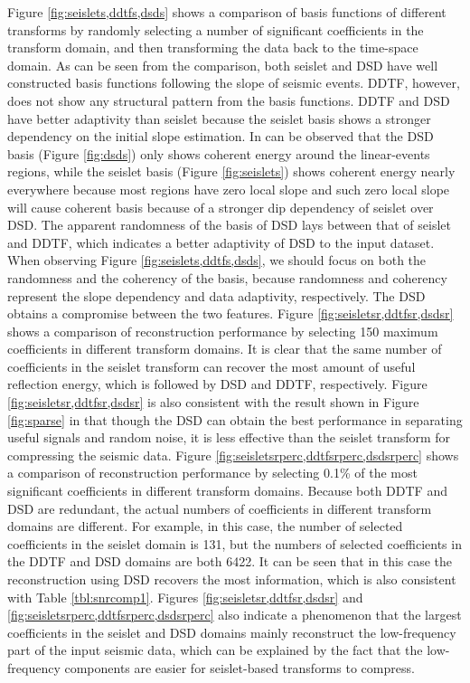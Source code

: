 Figure \ref{fig:seislets,ddtfs,dsds} shows a comparison of basis functions of different transforms by randomly selecting a number of significant coefficients in the transform domain, and then transforming the data back to the time-space domain. As can be seen from the comparison, both seislet and DSD have well constructed basis functions following the slope of seismic events. DDTF, however, does not show any structural pattern from the basis functions. DDTF and DSD have better adaptivity than seislet because the seislet basis shows a stronger dependency on the initial slope estimation. In can be observed that the DSD basis (Figure \ref{fig:dsds}) only shows coherent energy around the linear-events regions, while the seislet basis (Figure \ref{fig:seislets}) shows coherent energy nearly everywhere because most regions have zero local slope and such zero local slope will cause coherent basis because of a stronger dip dependency of seislet over DSD. The apparent randomness of the basis of DSD lays between that of seislet and DDTF, which indicates a better adaptivity of DSD to the input dataset. When observing Figure \ref{fig:seislets,ddtfs,dsds}, we should focus on both the randomness and the coherency of the basis, because randomness and coherency represent the slope dependency and data adaptivity, respectively. The DSD obtains a compromise between the two features.  Figure \ref{fig:seisletsr,ddtfsr,dsdsr} shows a comparison of reconstruction performance by selecting 150 maximum coefficients in different transform domains. It is clear that the same number of coefficients in the seislet transform can recover the most amount of useful reflection energy, which is followed by DSD and DDTF, respectively. Figure \ref{fig:seisletsr,ddtfsr,dsdsr} is also consistent with the result shown in Figure \ref{fig:sparse} in that though the DSD can obtain the best performance in separating useful signals and random noise, it is less effective than the seislet transform for compressing the seismic data. Figure \ref{fig:seisletsrperc,ddtfsrperc,dsdsrperc} shows a comparison of reconstruction performance by selecting 0.1\% of the most significant coefficients in different transform domains. Because both DDTF and DSD are redundant, the actual numbers of coefficients in different transform domains are different. For example, in this case, the number of selected coefficients in the seislet domain is 131, but the numbers of selected coefficients in the DDTF and DSD domains are both 6422. It can be seen that in this case the reconstruction using DSD recovers the most information, which is also consistent with Table \ref{tbl:snrcomp1}.  Figures \ref{fig:seisletsr,ddtfsr,dsdsr} and \ref{fig:seisletsrperc,ddtfsrperc,dsdsrperc} also indicate a phenomenon that the largest coefficients in the seislet and DSD domains mainly reconstruct the low-frequency part of the input seismic data, which can be explained by the fact that the low-frequency components are easier for seislet-based transforms to compress.

